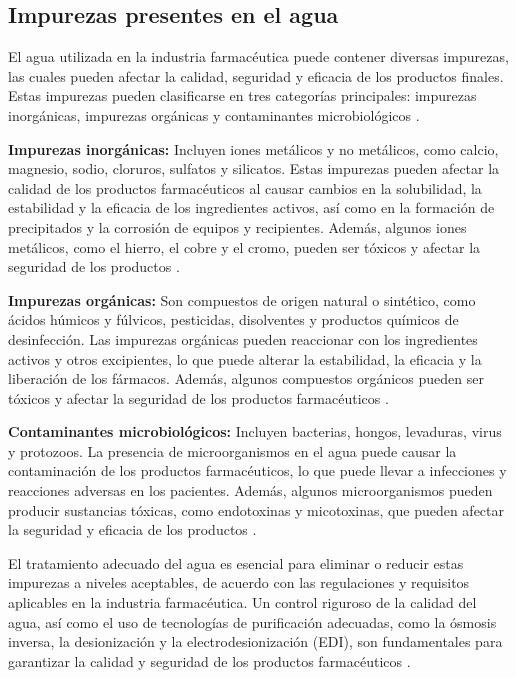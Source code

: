 \subsection{Impurezas presentes en el agua}

El agua utilizada en la industria farmacéutica puede contener diversas impurezas, las cuales pueden afectar la calidad, seguridad y eficacia 
de los productos finales. Estas impurezas pueden clasificarse en tres categorías principales: impurezas inorgánicas,
 impurezas orgánicas y contaminantes microbiológicos \cite{luiscarrascoQueTipoImpurezas2021}.

\textbf{Impurezas inorgánicas: }Incluyen iones metálicos y no metálicos, como calcio, magnesio, sodio, 
cloruros, sulfatos y silicatos. Estas impurezas pueden afectar la calidad de los productos farmacéuticos
 al causar cambios en la solubilidad, la estabilidad y la eficacia de los ingredientes activos, así 
 como en la formación de precipitados y la corrosión de equipos y recipientes. Además, algunos iones 
 metálicos, como el hierro, el cobre y el cromo, pueden ser tóxicos y afectar la seguridad de los productos \cite{elgaveoliaImpactoCompuestosInorganicos2018}.

\textbf{Impurezas orgánicas: }Son compuestos de origen natural o sintético, como ácidos húmicos y 
fúlvicos, pesticidas, disolventes y productos químicos de desinfección. Las impurezas orgánicas pueden 
reaccionar con los ingredientes activos y otros excipientes, lo que puede alterar la estabilidad, la eficacia
 y la liberación de los fármacos. Además, algunos compuestos orgánicos pueden ser tóxicos y afectar la 
 seguridad de los productos farmacéuticos \cite{elgalabwaterImpactoCompuestosOrganicos2018}.

\textbf{Contaminantes microbiológicos:} Incluyen bacterias, hongos, levaduras, virus y protozoos. 
La presencia de microorganismos en el agua puede causar la contaminación de los productos farmacéuticos, 
lo que puede llevar a infecciones y reacciones adversas en los pacientes. Además, algunos microorganismos 
pueden producir sustancias tóxicas, como endotoxinas y micotoxinas, que pueden afectar la seguridad y eficacia de los productos \cite{mireyadelpilararcospulidoIndicadoresMicrobiologicosContaminacion2015}.

El tratamiento adecuado del agua es esencial para eliminar o reducir estas impurezas a niveles aceptables, 
de acuerdo con las regulaciones y requisitos aplicables en la industria farmacéutica. Un control riguroso de la calidad
 del agua, así como el uso de tecnologías de purificación adecuadas, como la ósmosis inversa, la desionización y la 
 electrodesionización (EDI), son fundamentales para garantizar la calidad y seguridad de los productos farmacéuticos .
